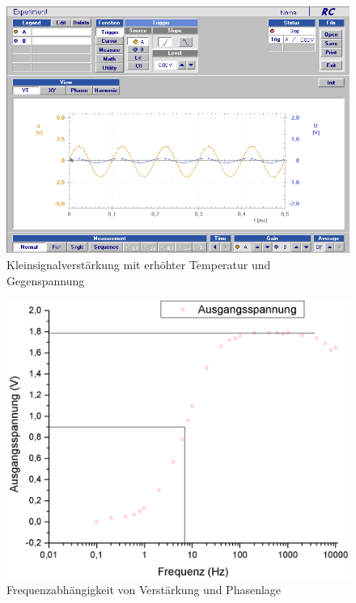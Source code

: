 \documentclass[12pt,a4paper]{article}
\begin{document}
\begin{figure}[H]
	\centering
	\includegraphics[scale=0.5]{./data/Braun_Kurz_PS8/Kleinsignalverstaerkung_Temp_Gegenspannung.png}
	\caption{Kleinsignalverstärkung mit erhöhter Temperatur und Gegenspannung}
	\label{fig:kleinsignalverstaerkung_temp_gegen}
\end{figure}

\begin{figure}[H]
	\centering
	\includegraphics[scale=0.5]{./data/frequenzabhaengigkeit.png}
	\caption{Frequenzabhängigkeit von Verstärkung und Phasenlage}
	\label{fig:frequenzabh}
\end{figure}
\end{document}
